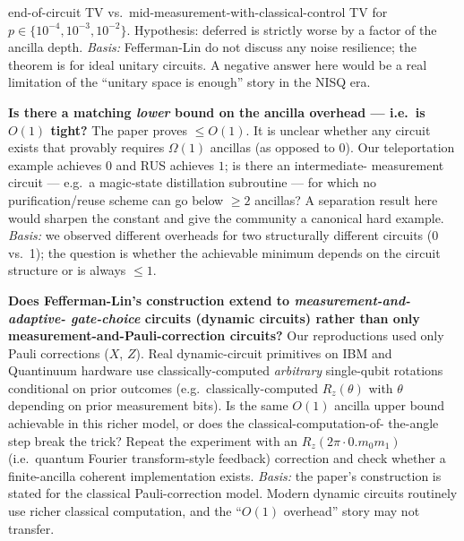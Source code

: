 \begin{description}
        end-of-circuit TV vs.\ mid-measurement-with-classical-control TV for $p \in
        \{10^{-4}, 10^{-3}, 10^{-2}\}$.  Hypothesis: deferred is strictly worse by a factor
        of the ancilla depth.
        \textit{Basis:} Fefferman-Lin do not discuss any noise resilience; the theorem is
        for ideal unitary circuits.  A negative answer here would be a real limitation of
        the ``unitary space is enough'' story in the NISQ era.
  \item[Q4.] \textbf{Is there a matching \emph{lower} bound on the ancilla overhead --- i.e.\
        is $O(1)$ tight?}  The paper proves $\le O(1)$.  It is unclear whether any circuit
        exists that provably requires $\Omega(1)$ ancillas (as opposed to $0$).  Our
        teleportation example achieves $0$ and RUS achieves $1$; is there an intermediate-
        measurement circuit --- e.g.\ a magic-state distillation subroutine --- for which
        no purification/reuse scheme can go below $\ge 2$ ancillas?  A separation result
        here would sharpen the constant and give the community a canonical hard example.
        \textit{Basis:} we observed different overheads for two structurally different
        circuits (0 vs.\ 1); the question is whether the achievable minimum depends on the
        circuit structure or is always $\le 1$.
  \item[Q5.] \textbf{Does Fefferman-Lin's construction extend to \emph{measurement-and-adaptive-
        gate-choice} circuits (dynamic circuits) rather than only measurement-and-Pauli-correction
        circuits?}  Our reproductions used only Pauli corrections ($X$, $Z$).  Real dynamic-circuit
        primitives on IBM and Quantinuum hardware use classically-computed \emph{arbitrary}
        single-qubit rotations conditional on prior outcomes (e.g.\ classically-computed $R_z(\theta)$
        with $\theta$ depending on prior measurement bits).  Is the same $O(1)$ ancilla
        upper bound achievable in this richer model, or does the classical-computation-of-
        the-angle step break the trick?  Repeat the experiment with an $R_z(2\pi \cdot 0.\!m_0m_1)$
        (i.e.\ quantum Fourier transform-style feedback) correction and check whether a
        finite-ancilla coherent implementation exists.
        \textit{Basis:} the paper's construction is stated for the classical
        Pauli-correction model.  Modern dynamic circuits routinely use richer classical
        computation, and the ``$O(1)$ overhead'' story may not transfer.
\end{description}
